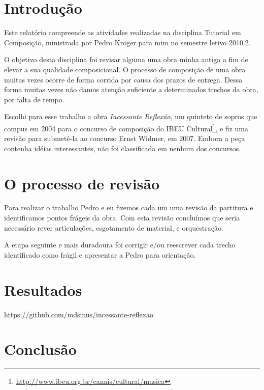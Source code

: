 \documentclass[10pt]{article}
\newcommand{\piece}[0]{\textit{Incessante Reflexão}}
\begin{document}

\section{Introdução}
\label{sec:introducao}

Este relatório compreende as atividades realizadas na disciplina
Tutorial em Composição, ministrada por Pedro Kröger para mim no
semestre letivo 2010.2.

O objetivo desta disciplina foi revisar alguma uma obra minha antiga a
fim de elevar a sua qualidade composicional.
O processo de composição de uma obra muitas vezes ocorre de forma
corrida por causa dos prazos de entrega. Dessa forma muitas vezes não
damos atenção suficiente a determinados trechos da obra, por falta de
tempo.

Escolhi para esse trabalho a obra \piece{}, um quinteto de sopros que
compus em 2004 para o concurso de composição do IBEU
Cultural\footnote{\url{http://www.ibeu.org.br/canais/cultural/musica}},
e fiz uma revisão para submetê-la ao concurso Ernst Widmer, em
2007. Embora a peça contenha idéias interessantes, não foi
classificada em nenhum dos concursos.

\section{O processo de revisão}
\label{sec:o-processo-de}

Para realizar o trabalho Pedro e eu fizemos cada um uma revisão da
partitura e identificamos pontos frágeis da obra. Com esta revisão
concluímos que seria necessário rever articulações, esgotamento de
material, e orquestração.

A etapa seguinte e mais duradoura foi corrigir e/ou reescrever cada
trecho identificado como frágil e apresentar a Pedro para orientação.

\section{Resultados}
\label{sec:resultados}



\url{https://github.com/mdsmus/incessante-reflexao}

\section{Conclusão}
\label{sec:conclusao}
\end{document}
